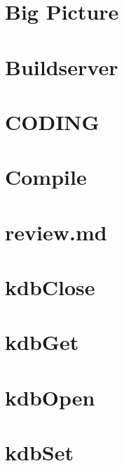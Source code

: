 \let\mypdfximage\pdfximage\def\pdfximage{\immediate\mypdfximage}\documentclass[twoside]{book}
\newcommand{\+}{\discretionary{\mbox{\scriptsize$\hookleftarrow$}}{}{}}
\begin{document}
\chapter{Big Picture}
\label{doc_BIGPICTURE_md}

\chapter{Buildserver}
\label{doc_BUILDSERVER_md}

\chapter{CODING}
\label{doc_CODING_md}

\chapter{Compile}
\label{doc_COMPILE_md}

\chapter{review.\+md}
\label{doc_contrib_api_review_md}

\chapter{kdb\+Close}
\label{doc_contrib_api_reviews_core_kdbClose_md}

\chapter{kdb\+Get}
\label{doc_contrib_api_reviews_core_kdbGet_md}

\chapter{kdb\+Open}
\label{doc_contrib_api_reviews_core_kdbOpen_md}

\chapter{kdb\+Set}
\label{doc_contrib_api_reviews_core_kdbSet_md}

\end{document}
